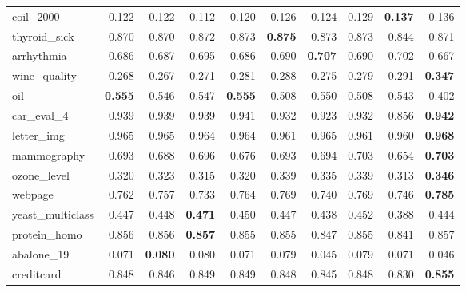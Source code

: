 {\begin{longtable}{lrrrrrrrrr}
coil\_2000 & 0.122 & 0.122 & 0.112 & 0.120 & 0.126 & 0.124 & 0.129 & \textbf{0.137} & 0.136 \\
thyroid\_sick & 0.870 & 0.870 & 0.872 & 0.873 & \textbf{0.875} & 0.873 & 0.873 & 0.844 & 0.871 \\
arrhythmia & 0.686 & 0.687 & 0.695 & 0.686 & 0.690 & \textbf{0.707} & 0.690 & 0.702 & 0.667 \\
wine\_quality & 0.268 & 0.267 & 0.271 & 0.281 & 0.288 & 0.275 & 0.279 & 0.291 & \textbf{0.347} \\
oil & \textbf{0.555} & 0.546 & 0.547 & \textbf{0.555} & 0.508 & 0.550 & 0.508 & 0.543 & 0.402 \\
car\_eval\_4 & 0.939 & 0.939 & 0.939 & 0.941 & 0.932 & 0.923 & 0.932 & 0.856 & \textbf{0.942} \\
letter\_img & 0.965 & 0.965 & 0.964 & 0.964 & 0.961 & 0.965 & 0.961 & 0.960 & \textbf{0.968} \\
mammography & 0.693 & 0.688 & 0.696 & 0.676 & 0.693 & 0.694 & 0.703 & 0.654 & \textbf{0.703} \\
ozone\_level & 0.320 & 0.323 & 0.315 & 0.320 & 0.339 & 0.335 & 0.339 & 0.313 & \textbf{0.346} \\
webpage & 0.762 & 0.757 & 0.733 & 0.764 & 0.769 & 0.740 & 0.769 & 0.746 & \textbf{0.785} \\
yeast\_multiclass & 0.447 & 0.448 & \textbf{0.471} & 0.450 & 0.447 & 0.438 & 0.452 & 0.388 & 0.444 \\
protein\_homo & 0.856 & 0.856 & \textbf{0.857} & 0.855 & 0.855 & 0.847 & 0.855 & 0.841 & 0.857 \\
abalone\_19 & 0.071 & \textbf{0.080} & 0.080 & 0.071 & 0.079 & 0.045 & 0.079 & 0.071 & 0.046 \\
creditcard & 0.848 & 0.846 & 0.849 & 0.849 & 0.848 & 0.845 & 0.848 & 0.830 & \textbf{0.855} \\
\bottomrule
\end{longtable}}